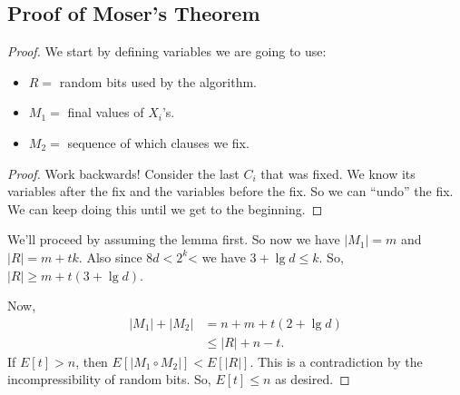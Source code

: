 \documentclass{report}
\begin{document}
\subsection{Proof of Moser's Theorem}
\begin{proof}
    We start by defining variables we are going to use:
    \begin{itemize}
        \item $R =$ random bits used by the algorithm. 
        \item $M_1 =$ final values of $X_i$'s. 
        \item $M_2 =$ sequence of which clauses we fix.
    \end{itemize}
    \begin{proof}
        Work backwards! Consider the last $C_i$ that was fixed. We know its variables after the fix and the variables before the fix. So we can ``undo'' the fix. We can keep doing this until we get to the beginning.
    \end{proof}
    We'll proceed by assuming the lemma first. So now we have $|M_1| = m$ and $|R| = m + tk$. Also since $8d < 2^k$< we have $3 + \lg d \leq k$. So, $|R| \geq m + t(3 + \lg d)$. 

    Now,
    \begin{align*}
        |M_1| + |M_2| &= n + m + t(2 + \lg d) \\
        &\leq |R| + n - t.
    \end{align*}
    If $E[t] > n$, then $E[|M_1 \circ M_2|] < E[|R|]$. This is a contradiction by the incompressibility of random bits. So, $E[t] \leq n$ as desired.
\end{proof}
\end{document}
